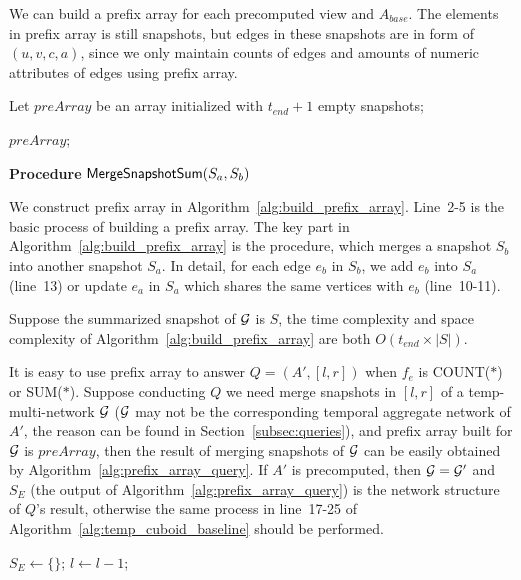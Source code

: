 \documentclass[10pt,journal,compsoc]{IEEEtran}
\begin{document}
{ We can build a prefix array for each precomputed view and $ A_{base} $. The elements in prefix array is still snapshots, but edges in these snapshots are in form of $ (u,v,c,a) $, since we only maintain counts of edges and amounts of numeric attributes of edges using prefix array.
\begin{algorithm}[t]
	\scriptsize
	\caption{$\kw{Build Prefix Array}$}
	\label{alg:build_prefix_array}
	Let $ preArray $ be an array initialized with $ t_{end}+1 $ empty snapshots;
	

	\Return $ preArray $;

	\vspace*{0.2cm}
	{\bf Procedure} {${\mathsf{MergeSnapshotSum}}(S_a,S_b)$}
	
\end{algorithm}

We construct prefix array in Algorithm~\ref{alg:build_prefix_array}. Line~2-5 is the basic process of building a prefix array. The key part in Algorithm~\ref{alg:build_prefix_array} is the  procedure, which merges a snapshot $ S_b $ into another snapshot $ S_a $. In detail, for each edge $ e_b $ in $ S_b $, we add $ e_b $ into $ S_a $ (line~13) or update $ e_a $ in $ S_a $ which shares the same vertices with $ e_b $ (line~10-11).

Suppose the summarized snapshot of $ \mathcal{G} $ is $ S $, the time complexity and space complexity of Algorithm~\ref{alg:build_prefix_array} are both $ O(t_{end}\times |S|) $.

 It is easy to use prefix array to answer $ Q=(A',[l,r]) $ when $ f_e $ is COUNT($\ast$) or SUM($\ast$). Suppose conducting $ Q $ we need merge snapshots in $ [l,r] $ of a temp-multi-network $ \mathcal{G} $ ($ \mathcal{G} $ may not be the corresponding temporal aggregate network of $ A' $, the reason can be found in Section~\ref{subsec:queries}), and prefix array built for $ \mathcal{G} $ is $ preArray $, then the result of merging snapshots of $ \mathcal{G} $ can be easily obtained by Algorithm~\ref{alg:prefix_array_query}. If $ A' $ is precomputed, then $ \mathcal{G}=\mathcal{G}' $ and $ S_E $ (the output of Algorithm~\ref{alg:prefix_array_query}) is the network structure of $ Q $'s result, otherwise the same process in line~17-25 of Algorithm~\ref{alg:temp_cuboid_baseline} should be performed.
\begin{algorithm}[t]
	\scriptsize
	\caption{$\kw{Prefix Array Query}$}
	\label{alg:prefix_array_query}
	$ S_E \gets \{\} $;
	$ l \gets l-1 $;
	

\end{algorithm}}
\end{document}
